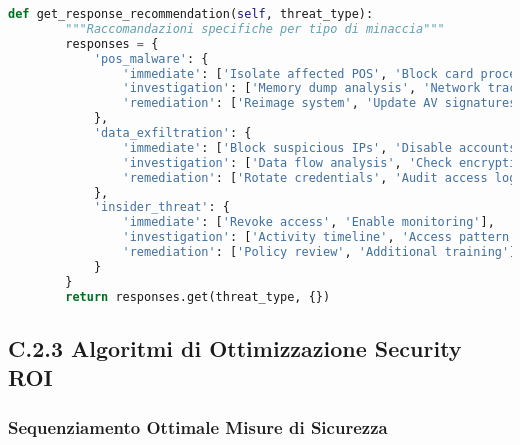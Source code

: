 \begin{lstlisting}[language=Python, caption=ML Pipeline per Threat Detection GDO]
    def get_response_recommendation(self, threat_type):
        """Raccomandazioni specifiche per tipo di minaccia"""
        responses = {
            'pos_malware': {
                'immediate': ['Isolate affected POS', 'Block card processing'],
                'investigation': ['Memory dump analysis', 'Network trace'],
                'remediation': ['Reimage system', 'Update AV signatures']
            },
            'data_exfiltration': {
                'immediate': ['Block suspicious IPs', 'Disable accounts'],
                'investigation': ['Data flow analysis', 'Check encryption'],
                'remediation': ['Rotate credentials', 'Audit access logs']
            },
            'insider_threat': {
                'immediate': ['Revoke access', 'Enable monitoring'],
                'investigation': ['Activity timeline', 'Access pattern analysis'],
                'remediation': ['Policy review', 'Additional training']
            }
        }
        return responses.get(threat_type, {})
\end{lstlisting}

\subsection{C.2.3 Algoritmi di Ottimizzazione Security ROI}

\subsubsection{Sequenziamento Ottimale Misure di Sicurezza}

